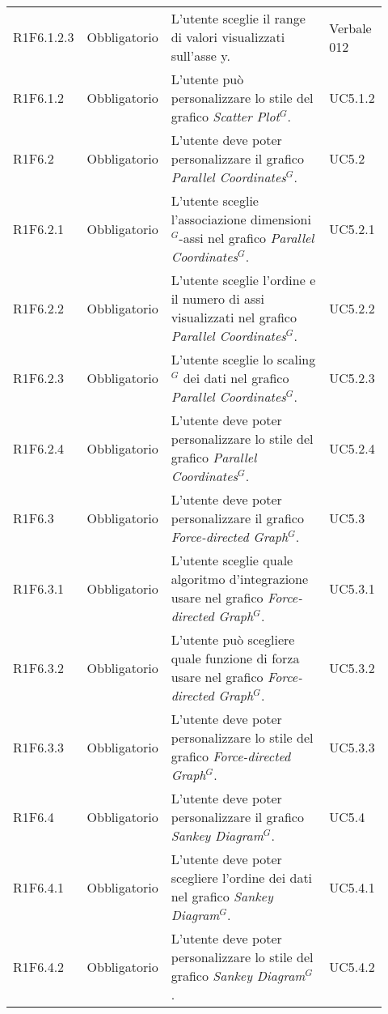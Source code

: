 {\begin{longtable}{p{0.12\linewidth}p{0.15\linewidth}p{0.50\linewidth}p{0.15\linewidth}}
    \rowcolor[RGB]{216, 235, 171}
    R1F6.1.2.3 & Obbligatorio & L'utente sceglie il range di valori visualizzati sull'asse y. & Verbale 012 \\
    \rowcolor[RGB]{216, 235, 171}
    R1F6.1.2 & Obbligatorio & L'utente può personalizzare lo stile del grafico \textit{Scatter Plot$^{G}$}. & UC5.1.2\\
    \rowcolor[RGB]{233, 245, 206}
    R1F6.2 & Obbligatorio & L'utente deve poter personalizzare il grafico \textit{Parallel Coordinates$^{G}$}. & UC5.2\\
    \rowcolor[RGB]{216, 235, 171}
    R1F6.2.1 & Obbligatorio & L'utente sceglie l'associazione dimensioni$^{G}$-assi nel grafico \textit{Parallel Coordinates$^{G}$}. & UC5.2.1\\
    \rowcolor[RGB]{233, 245, 206}
    R1F6.2.2 & Obbligatorio & L'utente sceglie l'ordine e il numero di assi visualizzati nel grafico \textit{Parallel Coordinates$^{G}$}. & UC5.2.2\\
    \rowcolor[RGB]{216, 235, 171}
    R1F6.2.3 & Obbligatorio & L'utente sceglie lo scaling$^{G}$ dei dati nel grafico \textit{Parallel Coordinates$^{G}$}. & UC5.2.3\\
    \rowcolor[RGB]{233, 245, 206}
    R1F6.2.4 & Obbligatorio & L'utente deve poter personalizzare lo stile del grafico \textit{Parallel Coordinates$^{G}$}. & UC5.2.4\\
    \rowcolor[RGB]{216, 235, 171}
    R1F6.3 & Obbligatorio & L'utente deve poter personalizzare il grafico \textit{Force-directed Graph$^{G}$}. & UC5.3\\
    \rowcolor[RGB]{233, 245, 206}
    R1F6.3.1 & Obbligatorio & L'utente sceglie quale algoritmo d'integrazione usare nel grafico \textit{Force-directed Graph$^{G}$}. & UC5.3.1\\
    \rowcolor[RGB]{216, 235, 171}
    R1F6.3.2 & Obbligatorio & L'utente può scegliere quale funzione di forza usare nel grafico \textit{Force-directed Graph$^{G}$}. & UC5.3.2\\
    \rowcolor[RGB]{233, 245, 206}
    R1F6.3.3 & Obbligatorio & L'utente deve poter personalizzare lo stile del grafico \textit{Force-directed Graph$^{G}$}. & UC5.3.3\\
    \rowcolor[RGB]{216, 235, 171}
    R1F6.4 & Obbligatorio & L'utente deve poter personalizzare il grafico \textit{Sankey Diagram$^{G}$}. & UC5.4\\
    \rowcolor[RGB]{233, 245, 206}
    R1F6.4.1 & Obbligatorio & L'utente deve poter scegliere l'ordine dei dati nel grafico \textit{Sankey Diagram$^{G}$}. & UC5.4.1\\
    \rowcolor[RGB]{216, 235, 171}
    R1F6.4.2 & Obbligatorio & L'utente deve poter personalizzare lo stile del grafico \textit{Sankey Diagram$^{G}$}. & UC5.4.2\\


\end{longtable}}
